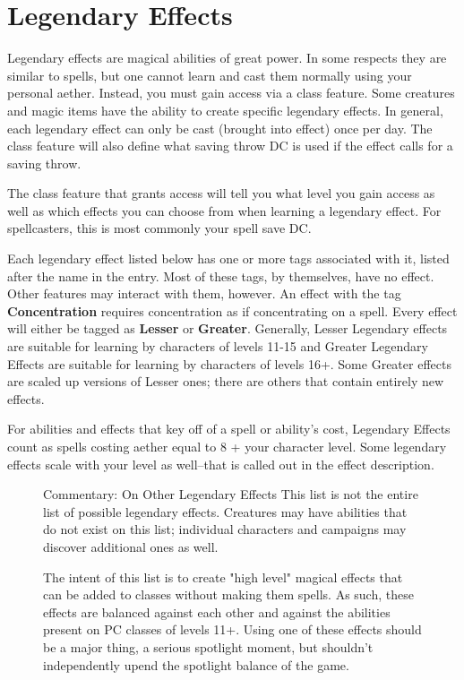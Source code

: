 \section{Legendary Effects}
\label{sec:legendary-effects}
Legendary effects are magical abilities of great power. In some respects they are similar to spells, but one cannot learn and cast them normally using your personal aether. Instead, you must gain access via a class feature. Some creatures and magic items have the ability to create specific legendary effects. In general, each legendary effect can only be cast (brought into effect) once per day. The class feature will also define what saving throw DC is used if the effect calls for a saving throw.

The class feature that grants access will tell you what level you gain access as well as which effects you can choose from when learning a legendary effect.  For spellcasters, this is most commonly your spell save DC.

Each legendary effect listed below has one or more tags associated with it, listed after the name in the entry. Most of these tags, by themselves, have no effect. Other features may interact with them, however. An effect with the tag \textbf{Concentration} requires concentration as if concentrating on a spell. Every effect will either be tagged as \textbf{Lesser} or \textbf{Greater}. Generally, Lesser Legendary effects are suitable for learning by characters of levels 11-15 and Greater Legendary Effects are suitable for learning by characters of levels 16+. Some Greater effects are scaled up versions of Lesser ones; there are others that contain entirely new effects.

For abilities and effects that key off of a spell or ability's cost, Legendary Effects count as spells costing aether equal to 8 + your character level. Some legendary effects scale with your level as well--that is called out in the effect description.
\begin{figure}[tb]
\begin{DndComment}{Commentary: On Other Legendary Effects}
	This list is not the entire list of possible legendary effects. Creatures may have abilities that do not exist on this list; individual characters and campaigns may discover additional ones as well.

	The intent of this list is to create "high level" magical effects that can be added to classes without making them spells. As such, these effects are balanced against each other and against the abilities present on PC classes of levels 11+. Using one of these effects should be a major thing, a serious spotlight moment, but shouldn't independently upend the spotlight balance of the game.
\end{DndComment}
\end{figure}

